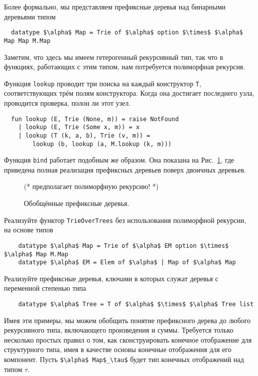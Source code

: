 Более формально, мы представляем префиксные деревья над бинарными
деревьями типом
\begin{lstlisting}
  datatype $\alpha$ Map = Trie of $\alpha$ option $\times$ $\alpha$ Map Map M.Map
\end{lstlisting}
Заметим, что здесь мы имеем гетерогенный рекурсивный тип, так что в
функциях, работающих с этим типом, нам потребуется полиморфная
рекурсия.

Функция \lstinline!lookup! проводит три поиска на каждый конструктор
\lstinline!T!, соответствующих трём полям конструктора. Когда она
достигает последнего узла, проводится проверка, полон ли этот узел.
\begin{lstlisting}
  fun lookup (E, Trie (None, m)) = raise NotFound
    | lookup (E, Trie (Some x, m)) = x
    | lookup (T (k, a, b), Trie (v, m)) = 
        lookup (b, lookup (a, M.lookup (k, m)))
\end{lstlisting}
Функция \lstinline!bind! работает подобным же образом. Она показана на
Рис.~\ref{fig:10.11}, где приведена полная реализация префиксных
деревьев поверх двоичных деревьев.

\begin{figure}
  \centering
  (* $\mbox{предполагает полиморфную рекурсию!}$ *)  
  \caption{Обобщённые префиксные деревья.}
  \label{fig:10.11}
\end{figure}

\begin{exercise}\label{ex:10.12}
  Реализуйте функтор \lstinline!TrieOverTrees! без использования
  полиморфной рекурсии, на основе типов
  \begin{lstlisting}
    datatype $\alpha$ Map = Trie of $\alpha$ EM option $\times$ $\alpha$ Map M.Map
    datatype $\alpha$ EM = Elem of $\alpha$ | Map of $\alpha$ Map
  \end{lstlisting}
\end{exercise}

\begin{exercise}
  Реализуйте префиксные деревья, ключами в которых служат деревья с
  переменной степенью типа
  \begin{lstlisting}
    datatype $\alpha$ Tree = T of $\alpha$ $\times$ $\alpha$ Tree list
  \end{lstlisting}
\end{exercise}

Имея эти примеры, мы можем обобщить понятие префиксного дерева до
любого рекурсивного типа, включающего произведения и суммы. Требуется
только несколько простых правил о том, как сконструировать конечное
отображение для структурного типа, имея в качестве основы конечные
отображения для его компонент. Пусть \lstinline!$\alpha$ Map$_\tau$!
будет тип конечных отображений над типом $\tau$.

